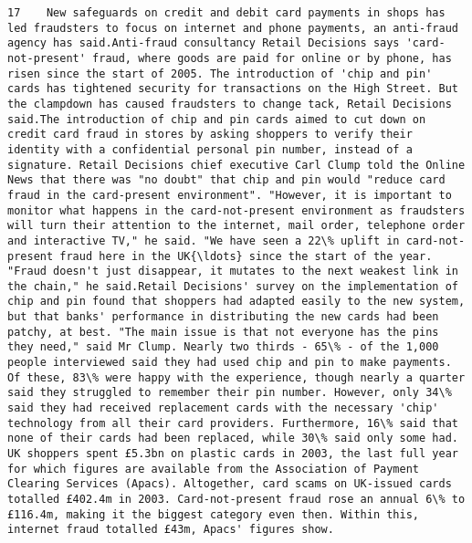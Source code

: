 \documentclass[11pt]{article}
\begin{document}
\begin{Verbatim}[commandchars=\\\{\}]
         17    New safeguards on credit and debit card payments in shops has led fraudsters to focus on internet and phone payments, an anti-fraud agency has said.Anti-fraud consultancy Retail Decisions says 'card-not-present' fraud, where goods are paid for online or by phone, has risen since the start of 2005. The introduction of 'chip and pin' cards has tightened security for transactions on the High Street. But the clampdown has caused fraudsters to change tack, Retail Decisions said.The introduction of chip and pin cards aimed to cut down on credit card fraud in stores by asking shoppers to verify their identity with a confidential personal pin number, instead of a signature. Retail Decisions chief executive Carl Clump told the Online News that there was "no doubt" that chip and pin would "reduce card fraud in the card-present environment". "However, it is important to monitor what happens in the card-not-present environment as fraudsters will turn their attention to the internet, mail order, telephone order and interactive TV," he said. "We have seen a 22\% uplift in card-not-present fraud here in the UK{\ldots} since the start of the year. "Fraud doesn't just disappear, it mutates to the next weakest link in the chain," he said.Retail Decisions' survey on the implementation of chip and pin found that shoppers had adapted easily to the new system, but that banks' performance in distributing the new cards had been patchy, at best. "The main issue is that not everyone has the pins they need," said Mr Clump. Nearly two thirds - 65\% - of the 1,000 people interviewed said they had used chip and pin to make payments. Of these, 83\% were happy with the experience, though nearly a quarter said they struggled to remember their pin number. However, only 34\% said they had received replacement cards with the necessary 'chip' technology from all their card providers. Furthermore, 16\% said that none of their cards had been replaced, while 30\% said only some had. UK shoppers spent £5.3bn on plastic cards in 2003, the last full year for which figures are available from the Association of Payment Clearing Services (Apacs). Altogether, card scams on UK-issued cards totalled £402.4m in 2003. Card-not-present fraud rose an annual 6\% to £116.4m, making it the biggest category even then. Within this, internet fraud totalled £43m, Apacs' figures show.                                                                                                                                                                                                                                                                                                                                                                                                                                                                                                                                                                                                                                                                                                                                                                                                                                                                                                                                                     
\end{Verbatim}
\end{document}
